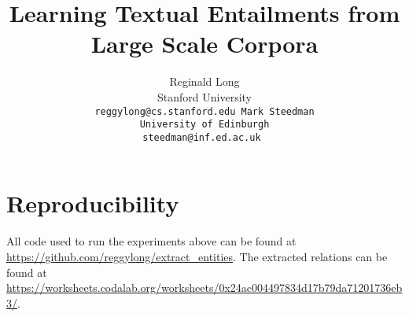 \documentclass[11pt]{article}
\title{Learning Textual Entailments from Large Scale Corpora}
\author{
  Reginald Long \\
  Stanford University \\
  \tt{reggylong@cs.stanford.edu}
\And
  Mark Steedman \\
  University of Edinburgh \\
  \tt{steedman@inf.ed.ac.uk}
}
\date{}
\begin{document}
\maketitle

\begin{abstract}
  
\end{abstract}



 




\section{Reproducibility}
All code used to run the experiments above can be
found at \url{https://github.com/reggylong/extract_entities}.
The extracted relations can be found at 
\url{https://worksheets.codalab.org/worksheets/0x24ac004497834d17b79da71201736eb3/}.



\end{document}
